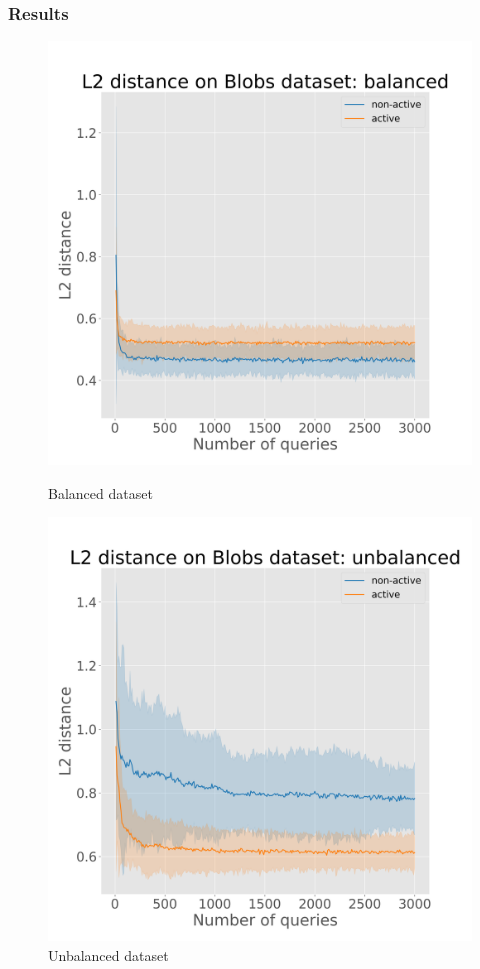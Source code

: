 \documentclass{beamer}
\begin{document}
\begin{frame}{}
    \frametitle{Results}
    \begin{figure}[!h]
      \centering
      \begin{minipage}{.45\textwidth}
        \centering
        \includegraphics[width=\linewidth]{active-vs-base-blobs-l2-loss_balanced-ci}
        \caption{Balanced dataset}\label{fig:linucb-blobs-l2-loss-balanced}
      \end{minipage}%
      \begin{minipage}{.45\textwidth}
        \centering
        \includegraphics[width=\linewidth]{active-vs-base-blobs-l2-loss_unbalanced-ci}
        \caption{Unbalanced dataset}\label{fig:linucb-blobs-l2-loss-unbalanced}
      \end{minipage}
    \end{figure}
\end{frame}
\end{document}
